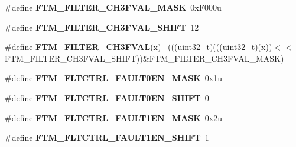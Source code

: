 \begin{DoxyCompactItemize}
\item 
\hypertarget{group___f_t_m___register___masks_gadced1643670251bc672a6903b3cd7f29}{}\#define {\bfseries F\+T\+M\+\_\+\+F\+I\+L\+T\+E\+R\+\_\+\+C\+H3\+F\+V\+A\+L\+\_\+\+M\+A\+S\+K}~0x\+F000u\label{group___f_t_m___register___masks_gadced1643670251bc672a6903b3cd7f29}

\item 
\hypertarget{group___f_t_m___register___masks_ga23a151bbeb877a2e2790071b9947bc30}{}\#define {\bfseries F\+T\+M\+\_\+\+F\+I\+L\+T\+E\+R\+\_\+\+C\+H3\+F\+V\+A\+L\+\_\+\+S\+H\+I\+F\+T}~12\label{group___f_t_m___register___masks_ga23a151bbeb877a2e2790071b9947bc30}

\item 
\hypertarget{group___f_t_m___register___masks_gab31c93f70f50170c0a6d8821aecf96ac}{}\#define {\bfseries F\+T\+M\+\_\+\+F\+I\+L\+T\+E\+R\+\_\+\+C\+H3\+F\+V\+A\+L}(x)                                    ~(((uint32\+\_\+t)(((uint32\+\_\+t)(x))$<$$<$F\+T\+M\+\_\+\+F\+I\+L\+T\+E\+R\+\_\+\+C\+H3\+F\+V\+A\+L\+\_\+\+S\+H\+I\+F\+T))\&F\+T\+M\+\_\+\+F\+I\+L\+T\+E\+R\+\_\+\+C\+H3\+F\+V\+A\+L\+\_\+\+M\+A\+S\+K)\label{group___f_t_m___register___masks_gab31c93f70f50170c0a6d8821aecf96ac}

\item 
\hypertarget{group___f_t_m___register___masks_ga55aa390cdac6997c93f7385ab41047ce}{}\#define {\bfseries F\+T\+M\+\_\+\+F\+L\+T\+C\+T\+R\+L\+\_\+\+F\+A\+U\+L\+T0\+E\+N\+\_\+\+M\+A\+S\+K}~0x1u\label{group___f_t_m___register___masks_ga55aa390cdac6997c93f7385ab41047ce}

\item 
\hypertarget{group___f_t_m___register___masks_gafa7b6c89e0fe43e698c029defe0c227e}{}\#define {\bfseries F\+T\+M\+\_\+\+F\+L\+T\+C\+T\+R\+L\+\_\+\+F\+A\+U\+L\+T0\+E\+N\+\_\+\+S\+H\+I\+F\+T}~0\label{group___f_t_m___register___masks_gafa7b6c89e0fe43e698c029defe0c227e}

\item 
\hypertarget{group___f_t_m___register___masks_gad7d98277395370cf8e028048aa97d3c3}{}\#define {\bfseries F\+T\+M\+\_\+\+F\+L\+T\+C\+T\+R\+L\+\_\+\+F\+A\+U\+L\+T1\+E\+N\+\_\+\+M\+A\+S\+K}~0x2u\label{group___f_t_m___register___masks_gad7d98277395370cf8e028048aa97d3c3}

\item 
\hypertarget{group___f_t_m___register___masks_ga35e4d4e03c8a8bc735f9a816f85665e6}{}\#define {\bfseries F\+T\+M\+\_\+\+F\+L\+T\+C\+T\+R\+L\+\_\+\+F\+A\+U\+L\+T1\+E\+N\+\_\+\+S\+H\+I\+F\+T}~1\label{group___f_t_m___register___masks_ga35e4d4e03c8a8bc735f9a816f85665e6}


\end{DoxyCompactItemize}

